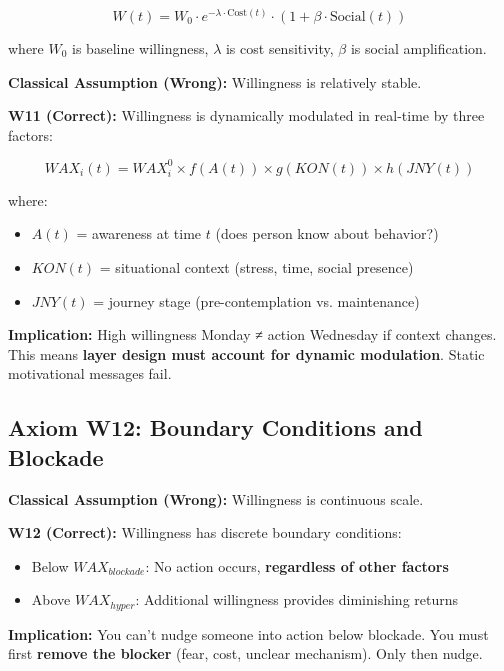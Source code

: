 \documentclass[11pt, a4paper]{article}
\begin{document}
\begin{equation}
W(t) = W_0 \cdot e^{-\lambda \cdot \text{Cost}(t)} \cdot (1 + \beta \cdot \text{Social}(t))
\end{equation}

where $W_0$ is baseline willingness, $\lambda$ is cost sensitivity, $\beta$ is social amplification.

\textbf{Classical Assumption (Wrong):} Willingness is relatively stable.

\textbf{W11 (Correct):} Willingness is dynamically modulated in real-time by three factors:

$$WAX_i(t) = WAX_i^0 \times f(A(t)) \times g(KON(t)) \times h(JNY(t))$$

where:
\begin{itemize}[nosep]
    \item $A(t)$ = awareness at time $t$ (does person know about behavior?)
    \item $KON(t)$ = situational context (stress, time, social presence)
    \item $JNY(t)$ = journey stage (pre-contemplation vs. maintenance)
\end{itemize}

\textbf{Implication:} High willingness Monday ≠ action Wednesday if context changes. This means \textbf{layer design must account for dynamic modulation}. Static motivational messages fail.

\subsection{Axiom W12: Boundary Conditions and Blockade} \label{sec:ch15-part1b}

\textbf{Classical Assumption (Wrong):} Willingness is continuous scale.

\textbf{W12 (Correct):} Willingness has discrete boundary conditions:

\begin{itemize}[nosep]
    \item Below $WAX_{blockade}$: No action occurs, \textbf{regardless of other factors}
    \item Above $WAX_{hyper}$: Additional willingness provides diminishing returns
\end{itemize}

\textbf{Implication:} You can't nudge someone into action below blockade. You must first \textbf{remove the blocker} (fear, cost, unclear mechanism). Only then nudge.
\end{document}
